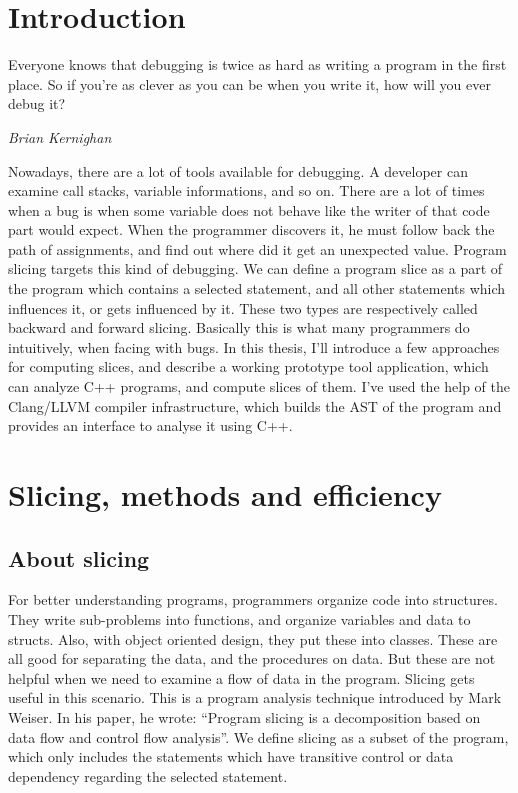 \documentclass[oneside,12pt,a4paper]{book}
\begin{document}
\chapter{Introduction}
\epigraph{Everyone knows that debugging is twice as hard as writing a program in the first place. So if you're as clever as you can be when you write it, how will you ever debug it?}{\textit{Brian Kernighan}}

Nowadays, there are a lot of tools available for debugging. A developer can examine call stacks, variable informations, and so on. There are a lot of times when a bug is when some variable does not behave like the writer of that code part would expect. When the programmer discovers it, he must follow back the path of assignments, and find out where did it get an unexpected value. Program slicing targets this kind of debugging. We can define a program slice as a part of the program which contains a selected statement, and all other statements which influences it, or gets influenced by it. These two types are respectively called backward and forward slicing. Basically this is what many programmers do intuitively, when facing with bugs. In this thesis, I'll introduce a few approaches for computing slices, and describe a working prototype tool application, which can analyze C++ programs, and compute slices of them. I've used the help of the Clang/LLVM compiler infrastructure, which builds the AST of the program and provides an interface to analyse it using C++.
\chapter{Slicing, methods and efficiency}
\section{About slicing}
For better understanding programs, programmers organize code into structures. They write sub-problems into functions, and organize variables and data to structs. Also, with object oriented design, they put these into classes. These are all good for separating the data, and the procedures on data. But these are not helpful when we need to examine a flow of data in the program. Slicing gets useful in this scenario. This is a program analysis technique introduced by Mark Weiser\cite{weiser84}. In his paper, he wrote: ``Program slicing is a decomposition based on data flow and control flow analysis''. We define slicing as a subset of the program, which only includes the statements which have transitive control or data dependency regarding the selected statement. 
\end{document}
